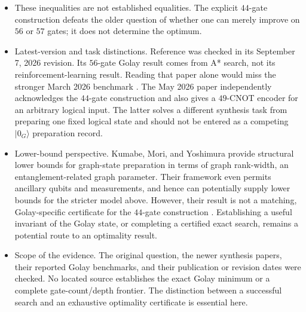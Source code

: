 \begin{itemize}
\begin{equation}
g_G(7)\le45,
\qquad
g_G(8)\le44,
\qquad
g_G(\infty)\le44.
\label{eq:c847-3}
\end{equation}

The displayed definitions, constraints, and target bounds are recorded in Eqs.~\eqref{eq:c847-3}.

  \item These inequalities are not established equalities. The explicit $44$-gate construction defeats the older question of whether one can merely improve on $56$ or $57$ gates; it does not determine the optimum.

  \item Latest-version and task distinctions. Reference  was checked in its September 7, 2026 revision. Its $56$-gate Golay result comes from A* search, not its reinforcement-learning result. Reading that paper alone would miss the stronger March 2026 benchmark . The May 2026 paper  independently acknowledges the $44$-gate construction and also gives a $49$-CNOT encoder for an arbitrary logical input. The latter solves a different synthesis task from preparing one fixed logical state and should not be entered as a competing $|0_G\rangle$ preparation record.

  \item Lower-bound perspective. Kumabe, Mori, and Yoshimura provide structural lower bounds for graph-state preparation in terms of graph rank-width, an entanglement-related graph parameter. Their framework even permits ancillary qubits and measurements, and hence can potentially supply lower bounds for the stricter model above. However, their result is not a matching, Golay-specific certificate for the $44$-gate construction . Establishing a useful invariant of the Golay state, or completing a certified exact search, remains a potential route to an optimality result.

  \item Scope of the evidence. The original question, the newer synthesis papers, their reported Golay benchmarks, and their publication or revision dates were checked. No located source establishes the exact Golay minimum or a complete gate-count/depth frontier. The distinction between a successful search and an exhaustive optimality certificate is essential here.
\end{itemize}

